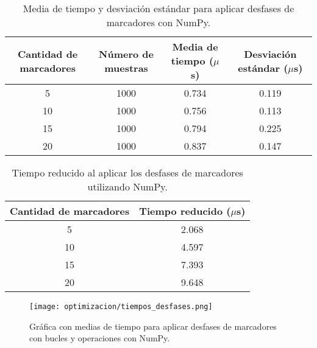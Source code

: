 \begin{table}[H]
	\centering
	\resizebox{\textwidth}{!} {
	\begin{tabular}{|c|c|c|c|}
		\hline
		\textbf{Cantidad de marcadores} & \textbf{Número de muestras} & \textbf{Media de tiempo ($\mu$s)} & \textbf{Desviación estándar ($\mu$s)} \\ \hline
		5                               & 1000                        & 0.734                         & 0.119                             \\ \hline
		10                              & 1000                        & 0.756                         & 0.113                             \\ \hline
		15                              & 1000                        & 0.794                         & 0.225                             \\ \hline
		20                              & 1000                        & 0.837                         & 0.147                             \\ \hline
	\end{tabular}}
	\caption{Media de tiempo y desviación estándar para aplicar desfases de marcadores con NumPy.}
	\label{cuadro:tiempos_desfases_numpy}
\end{table}

\begin{table}[H]
	\centering
	\resizebox{0.5\textwidth}{!} {
	\begin{tabular}{|c|c|}
		\hline
		\textbf{Cantidad de marcadores} & \textbf{Tiempo reducido ($\mu$s)} \\ \hline
		5                               & 2.068                         \\ \hline
		10                              & 4.597                         \\ \hline
		15                              & 7.393                         \\ \hline
		20                              & 9.648                         \\ \hline
	\end{tabular}}
	\caption{Tiempo reducido al aplicar los desfases de marcadores utilizando NumPy.}
	\label{cuadro:tiempo_reducido_desfases}
\end{table}

\begin{figure}[H]
	\centering
	\texttt{[image: optimizacion/tiempos\_desfases.png]}
	\caption{Gráfica con medias de tiempo para aplicar desfases de marcadores con bucles y operaciones con NumPy.}
	\label{fig:grafica_tiempos_desfases}
\end{figure}


